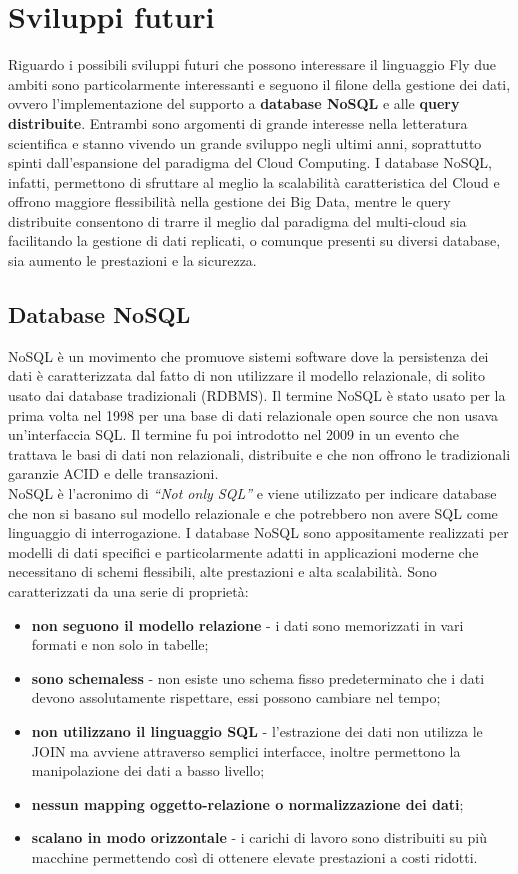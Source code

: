 \section{Sviluppi futuri}
Riguardo i possibili sviluppi futuri che possono interessare il linguaggio Fly due ambiti sono particolarmente interessanti e seguono il filone della gestione dei dati, ovvero l'implementazione del supporto a \textbf{database NoSQL} e alle \textbf{query distribuite}. Entrambi sono argomenti di grande interesse nella letteratura scientifica e stanno vivendo un grande sviluppo negli ultimi anni, soprattutto spinti dall'espansione del paradigma del Cloud Computing. I database NoSQL, infatti, permettono di sfruttare al meglio la scalabilità caratteristica del Cloud e offrono maggiore flessibilità nella gestione dei Big Data, mentre le query distribuite consentono di trarre il meglio dal paradigma del multi-cloud sia facilitando la gestione di dati replicati, o comunque presenti su diversi database, sia aumento le prestazioni e la sicurezza.

\subsection{Database NoSQL}
NoSQL è un movimento che promuove sistemi software dove la persistenza dei dati è caratterizzata dal fatto di non utilizzare il modello relazionale, di solito usato dai database tradizionali (RDBMS). Il termine NoSQL è stato usato per la prima volta nel 1998 per una base di dati relazionale open source che non usava un’interfaccia SQL. Il termine fu poi introdotto nel 2009 in un evento che trattava le basi di dati non relazionali, distribuite e che non offrono le tradizionali garanzie ACID e delle transazioni.\\
NoSQL è l’acronimo di \textit{“Not only SQL”} e viene utilizzato per indicare database che non si basano sul modello relazionale e che potrebbero non avere SQL come linguaggio di interrogazione. I database NoSQL sono appositamente realizzati per modelli di dati specifici e particolarmente adatti in applicazioni moderne che necessitano di schemi flessibili, alte prestazioni e alta scalabilità. Sono caratterizzati da una serie di proprietà:

\begin{itemize}
    \item \textbf{non seguono il modello relazione} - i dati sono memorizzati in vari formati e non solo in tabelle;
    \item \textbf{sono schemaless} - non esiste uno schema fisso predeterminato che i dati devono assolutamente rispettare, essi possono cambiare nel tempo;
    \item \textbf{non utilizzano il linguaggio SQL} - l’estrazione dei dati non utilizza le JOIN ma avviene attraverso semplici interfacce, inoltre permettono la manipolazione dei dati a basso livello;
    \item \textbf{nessun mapping oggetto-relazione o normalizzazione dei dati};
    \item \textbf{scalano in modo orizzontale} - i carichi di lavoro sono distribuiti su più macchine permettendo così di ottenere elevate prestazioni a costi ridotti.
\end{itemize}


